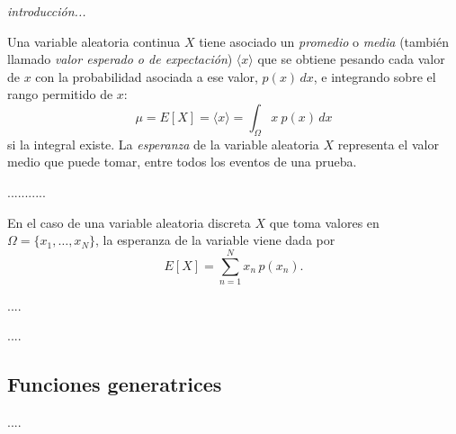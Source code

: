 \label{s:esperanzamomento}



\emph{introducci\'on...}


Una variable aleatoria continua $X$ tiene asociado un \emph{promedio} o \emph{media} (también llamado \emph{valor esperado o de expectación}) $\langle x\rangle$ que se obtiene pesando cada valor de $x$ con la probabilidad asociada a ese valor, $p(x)\,dx$, e integrando sobre el rango permitido de $x$: 
$$
\mu = E[X] = \langle x\rangle = \int_{\Omega} x \ p(x)\,dx
$$
si la integral existe. La \emph{esperanza} de la variable aleatoria $X$ representa el valor medio que puede tomar, entre todos los eventos de una prueba. 



...........

\hfill

En el caso de una variable aleatoria discreta $X$ que toma valores en $\Omega=\{x_1, \ldots, x_N\}$, la esperanza de la variable viene dada por 
$$
E[X] = \sum_{n=1}^N x_n \, p(x_n) . 
$$

....



....

\vspace{1.5pt}
\subsection{Funciones generatrices}

....

\vspace{1.5pt}
